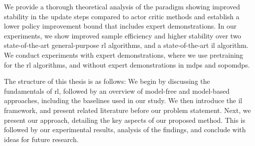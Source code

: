 We provide a thorough theoretical analysis of the paradigm showing improved stability in the update steps compared to actor critic methods and 
establish a lower policy improvement bound that includes expert demonstrations. 
In our experiments, we show improved sample efficiency and higher stability over two state-of-the-art general-purpose \ac{rl} algorithms, and a state-of-the-art \ac{il} algorithm. 
We conduct experiments with expert demonstrations, where we use pretraining for the \ac{rl} algorithms, and without expert demonstrations in \ac{mdp}s and \ac{sopomdp}s.

The structure of this thesis is as follows: We begin by discussing the fundamentals of \ac{rl}, followed by an overview of model-free and model-based approaches, 
including the baselines used in our study. We then introduce the \ac{il} framework, and present related literature before our problem statement. 
Next, we present our approach, detailing the key aspects of our proposed method. This is followed by our experimental results, analysis of the findings, and conclude with ideas for future research.